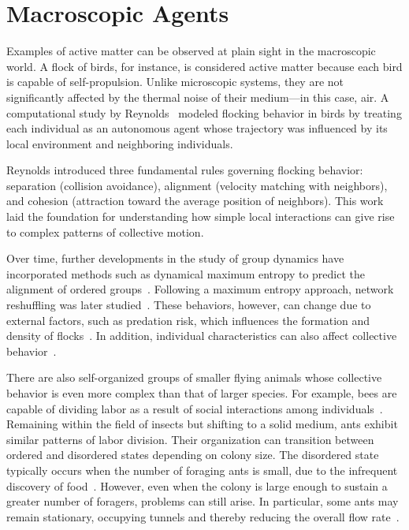 \section{Macroscopic Agents}

Examples of active matter can be observed at plain sight in the macroscopic world. A flock of birds, for instance, is considered active matter because each bird is capable of self-propulsion. Unlike microscopic systems, they are not significantly affected by the thermal noise of their medium—in this case, air. A computational study by Reynolds~\cite{reynolds1987flocks} modeled flocking behavior in birds by treating each individual as an autonomous agent whose trajectory was influenced by its local environment and neighboring individuals.

Reynolds introduced three fundamental rules governing flocking behavior: separation (collision avoidance), alignment (velocity matching with neighbors), and cohesion (attraction toward the average position of neighbors). This work laid the foundation for understanding how simple local interactions can give rise to complex patterns of collective motion. 

Over time, further developments in the study of group dynamics have incorporated methods such as dynamical maximum entropy to predict the alignment of ordered groups~\cite{cavagna2014dynamical}. Following a maximum entropy approach, network reshuffling was later studied~\cite{mora1511questioning}. These behaviors, however, can change due to external factors, such as predation risk, which influences the formation and density of flocks~\cite{carere2009aerial}. In addition, individual characteristics can also affect collective behavior~\cite{couzin2002collective}.


There are also self-organized groups of smaller flying animals whose collective behavior is even more complex than that of larger species. For example, bees are capable of dividing labor as a result of social interactions among individuals~\cite{jeanson2005emergence}. Remaining within the field of insects but shifting to a solid medium, ants exhibit similar patterns of labor division. Their organization can transition between ordered and disordered states depending on colony size. The disordered state typically occurs when the number of foraging ants is small, due to the infrequent discovery of food~\cite{beekman2001phase}. However, even when the colony is large enough to sustain a greater number of foragers, problems can still arise. In particular, some ants may remain stationary, occupying tunnels and thereby reducing the overall flow rate~\cite{aguilar2018collective}.

